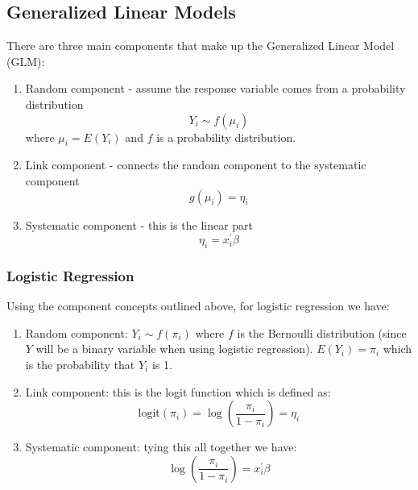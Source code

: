 \documentclass[paper=a4, fontsize=11pt]{scrartcl} %
\numberwithin{equation}{section} %
\numberwithin{figure}{section} %
\numberwithin{table}{section} %
\begin{document}
\subsection{Generalized Linear Models}

There are three main components that make up the Generalized Linear Model (GLM):

\begin{enumerate}
\item Random component - assume the response variable comes from a probability distribution
\begin{equation}
Y_i \sim f(\mu_i)
\end{equation}
where $\mu_i = E(Y_i)$ and $f$ is a probability distribution.
\item Link component - connects the random component to the systematic component
\begin{equation}
g(\mu_i)=\eta_i
\end{equation}
\item Systematic component - this is the linear part
\begin{equation}
\eta_i = x_i^\prime \beta
\end{equation}

\end{enumerate}


\subsubsection{Logistic Regression}

Using the component concepts outlined above, for logistic regression we have:

\begin{enumerate}
\item Random component: $Y_i \sim f(\pi_i)$ where $f$ is the Bernoulli distribution (since $Y$ will be a binary variable when using logistic regression). $E(Y_i) = \pi_i $ which is the probability that $Y_i$ is 1.
\item Link component: this is the logit function which is defined as:
\begin{equation}
\text{logit}(\pi_i) = \log \left(\frac{\pi_i}{1-\pi_i} \right) = \eta_i
\end{equation}
\item Systematic component: tying this all together we have:
\begin{equation}
\log \left(\frac{\pi_i}{1-\pi_i}\right) = x_i^\prime \beta
\end{equation}
\end{enumerate}
\end{document}
